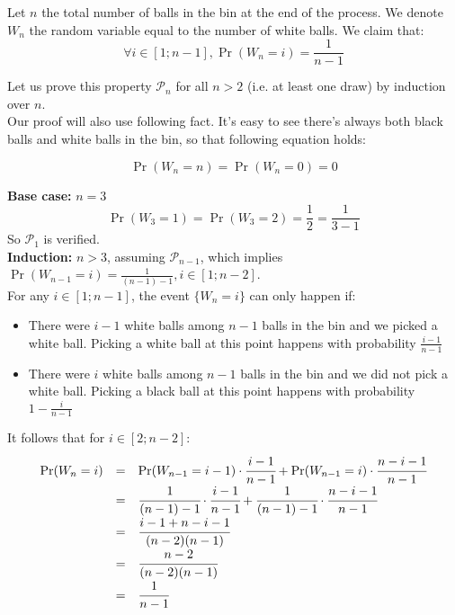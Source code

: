 \providecommand{\f}[2]{\ensuremath{\frac{#1}{#2}}}

Let $n$ the total number of balls in the bin at the end of the process. We denote $W_n$ the random variable equal to the number of white balls. We claim that:
\[
  \forall i \in [1; n-1], \Pr(W_n = i) = \f{1}{n - 1}
\]

Let us prove this property $\mathcal{P}_n$ for all $n > 2$ (i.e. at least one draw) by induction over $n$.\\

Our proof will also use following fact. It's easy to see there's always both black balls and white balls in the bin, so that following equation holds:

\[
  \Pr(W_n = n) = \Pr(W_n = 0) = 0
\]

\noindent
\textbf{Base case:} $n = 3$\\
\[
    \Pr(W_3 = 1) = \Pr(W_3 = 2) = \f{1}{2} = \f{1}{3 - 1}
\]
So $\mathcal{P}_1$ is verified.\\

\noindent
\textbf{Induction:} $n > 3$, assuming $\mathcal{P}_{n-1}$, which implies $\Pr(W_{n-1} = i) = \f{1}{(n - 1) - 1}, i \in [1;n - 2]$.\\
For any $i \in [1; n-1]$, the event $\{W_n = i\}$ can only happen if:
\begin{itemize}
  \item There were $i - 1$ white balls among $n - 1$ balls in the bin and we picked a white ball. Picking a white ball at this point happens with probability $\f{i - 1}{n - 1}$
  \item There were $i$ white balls among $n - 1$ balls in the bin and we did not pick a white ball. Picking a black ball at this point happens with probability $1 - \f{i}{n - 1}$
\end{itemize}

\noindent
It follows that for $i \in [2; n - 2]$:
\[\def\arraystretch{1.5}
  \begin{array}{lll}
    \Pr(W_n = i) & = & \Pr(W_{n-1} = i - 1) \cdot \cfrac{i - 1}{n - 1} + \Pr(W_{n-1} = i) \cdot \cfrac{n - i - 1}{n - 1} \\
                 & = & \cfrac{1}{(n - 1) - 1} \cdot \cfrac{i - 1}{n - 1} + \cfrac{1}{(n - 1) - 1} \cdot \cfrac{n - i - 1}{n - 1} \\
                 & = & \cfrac{i - 1 + n - i - 1}{(n - 2)(n-1)} \\
                 & = & \cfrac{n - 2}{(n - 2)(n-1)}\\
                 & = & \cfrac{1}{n - 1}
  \end{array}
\]

